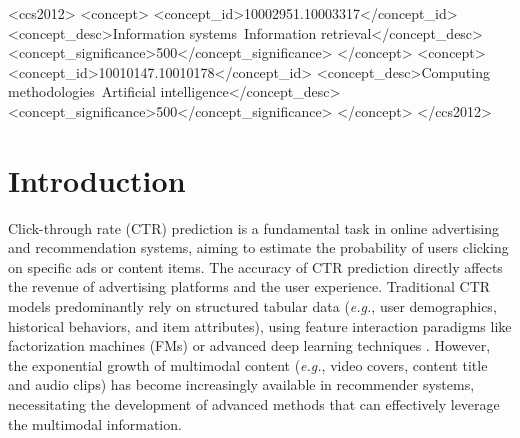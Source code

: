 \documentclass[sigconf, nonacm, screen]{acmart}
\begin{document}
\begin{CCSXML}
<ccs2012>
   <concept>
       <concept_id>10002951.10003317</concept_id>
       <concept_desc>Information systems~Information retrieval</concept_desc>
       <concept_significance>500</concept_significance>
   </concept>
   <concept>
       <concept_id>10010147.10010178</concept_id>
       <concept_desc>Computing methodologies~Artificial intelligence</concept_desc>
       <concept_significance>500</concept_significance>
   </concept>
 </ccs2012>
\end{CCSXML}



\maketitle

\section{Introduction}
Click-through rate (CTR) prediction is a fundamental task in online advertising and recommendation systems, aiming to estimate the probability of users clicking on specific ads or content items. 
The accuracy of CTR prediction directly affects the revenue of advertising platforms and the user experience. 
Traditional CTR models predominantly rely on structured tabular data (\emph{e.g.}, user demographics, historical behaviors, and item attributes), using feature interaction paradigms like factorization machines (FMs) \cite{FM, FFM, DeepFM, NFM, xDeepFM} or advanced deep learning techniques \cite{DIN, DCNv2, SASRec, AutoInt, TransAct}.
However, the exponential growth of multimodal content (\emph{e.g.}, video covers, content title and audio clips) has become increasingly available in recommender systems, necessitating the development of advanced methods that can effectively leverage the multimodal information.
\end{document}
